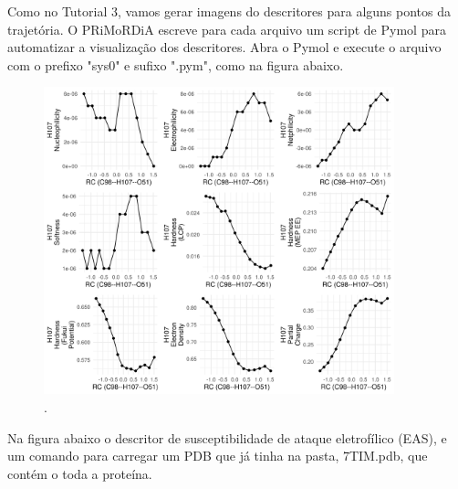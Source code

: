 \documentclass[a4paper,11pt]{refart}
\begin{document}
Como no Tutorial 3, vamos gerar imagens do descritores para alguns pontos da trajetória. O PRiMoRDiA escreve para cada arquivo um script de Pymol para automatizar a visualização dos descritores. Abra o Pymol e execute o arquivo com o prefixo "sys0" e sufixo ".pym", como na figura abaixo. 

\hspace*{-\leftmarginwidth}
\begin{minipage}{\fullwidth}
	\begin{figure}[H]
		\begin{center}
			\includegraphics[width=4in]{images/tut6_img5}
			\caption{.}
			\label{fig_tut6_4}
		\end{center}
	\end{figure}
\end{minipage}

Na figura abaixo o descritor de susceptibilidade de ataque eletrofílico (EAS), e um comando para carregar um PDB que já tinha na pasta, 7TIM.pdb, que contém o toda a proteína.
\end{document}
